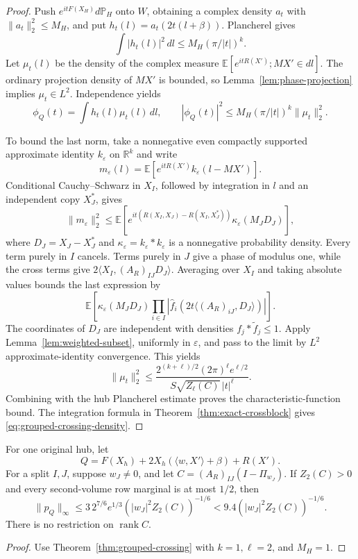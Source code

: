 \begin{proof}
Push \(e^{itF(X_H)}d\mathbb P_H\) onto \(W\), obtaining
a complex density \(a_t\) with
\(\|a_t\|_2^2\leq M_H\), and put
\(h_t(l)=\widehat a_t(2t(l+\beta))\).
Plancherel gives
\[
 \int|h_t(l)|^2\,dl\leq
 M_H(\pi/|t|)^k.
\]
Let \(\mu_t(l)\) be the density of the complex measure
\(\mathbb E[e^{itR(X')};MX'\in dl]\).
The ordinary projection density of \(MX'\) is bounded,
so Lemma~\ref{lem:phase-projection} implies \(\mu_t\in L^2\).
Independence yields
\[
 \phi_Q(t)=\int h_t(l)\mu_t(l)\,dl,\qquad
 |\phi_Q(t)|^2\leq M_H(\pi/|t|)^k\|\mu_t\|_2^2.
 \label{eq:grouped-pairing}
\]

To bound the last norm, take a nonnegative even compactly
supported approximate identity \(k_\varepsilon\) on
\(\mathbb R^k\) and write
\[
 m_\varepsilon(l)=
 \mathbb E[e^{itR(X')}k_\varepsilon(l-MX')].
\]
Conditional Cauchy--Schwarz in \(X_I\), followed by
integration in \(l\) and an independent copy \(X_J^*\),
gives
\[
 \|m_\varepsilon\|_2^2
 \leq
 \mathbb E\left[
 e^{it(R(X_I,X_J)-R(X_I,X_J^*))}
 \kappa_\varepsilon(M_JD_J)\right],
\]
where \(D_J=X_J-X_J^*\) and
\(\kappa_\varepsilon=k_\varepsilon*k_\varepsilon\)
is a nonnegative probability density.
Every term purely in \(I\) cancels.  Terms purely in
\(J\) give a phase of modulus one, while the cross terms
give \(2\langle X_I,(A_R)_{IJ}D_J\rangle\).
Averaging over \(X_I\) and taking absolute values bounds
the last expression by
\[
 \mathbb E\left[
 \kappa_\varepsilon(M_JD_J)
 \prod_{i\in I}
 |\widehat f_i(2t\langle(A_R)_{iJ},D_J\rangle)|
 \right].
\]
The coordinates of \(D_J\) are independent with densities
\(f_j*\widetilde f_j\leq1\).
Apply Lemma~\ref{lem:weighted-subset}, uniformly in
\(\varepsilon\), and pass to the limit by \(L^2\)
approximate-identity convergence.  This yields
\[
 \|\mu_t\|_2^2\leq
 \frac{2^{(k+\ell)/2}(2\pi)^\ell e^{\ell/2}}
 {S\sqrt{Z_\ell(C)}\,|t|^\ell}.
\]
Combining with the hub Plancherel estimate proves the
characteristic-function bound.  The integration formula
in Theorem~\ref{thm:exact-crossblock} gives
\eqref{eq:grouped-crossing-density}.
\end{proof}

\begin{corollary}
\label{cor:one-hub-arbitrary-crossing}
For one original hub, let
\[
 Q=F(X_h)+2X_h(\langle w,X'\rangle+\beta)+R(X').
\]
For a split \(I,J\), suppose \(w_J\ne0\), and let
\(C=(A_R)_{IJ}(I-\Pi_{w_J})\).
If \(Z_2(C)>0\) and every second-volume row marginal is
at most \(1/2\), then
\[
 \|p_Q\|_\infty
 \leq3\,2^{7/6}e^{1/3}
       (|w_J|^2Z_2(C))^{-1/6}
 <9.4(|w_J|^2Z_2(C))^{-1/6}.
\]
There is no restriction on \(\operatorname{rank}C\).
\end{corollary}
\begin{proof}
Use Theorem~\ref{thm:grouped-crossing} with
\(k=1,\ell=2\), and \(M_H=1\).
\end{proof}

